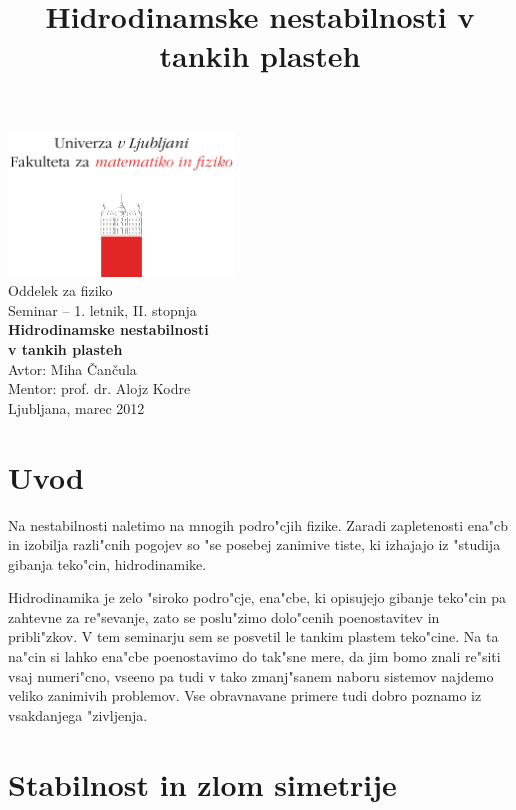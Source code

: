 \documentclass[a4paper,10pt]{article}
\title{Hidrodinamske nestabilnosti v tankih plasteh}
\begin{document}
\begin{center}
\includegraphics[width=6cm]{../logo_fmf_uni-lj_sl}\\[0.5cm]
Oddelek za fiziko \\[2cm]
{ \large Seminar -- 1. letnik, II. stopnja } \\[1cm]
{ \huge \bf Hidrodinamske nestabilnosti \\ v tankih plasteh}\\[2cm]
{\large Avtor: Miha \v Can\v cula}\\[0.6cm]
{\large Mentor: prof. dr. Alojz Kodre} \\[0.6cm]
{\large Ljubljana, marec 2012}
\end{center}
\vfill

\begin{abstract}

\end{abstract}

\newpage

\tableofcontents

\section{Uvod}

Na nestabilnosti naletimo na mnogih podro"cjih fizike. Zaradi zapletenosti ena"cb in izobilja razli"cnih pogojev so "se posebej zanimive tiste, ki izhajajo iz "studija gibanja teko"cin, hidrodinamike. 

Hidrodinamika je zelo "siroko podro"cje, ena"cbe, ki opisujejo gibanje teko"cin pa zahtevne za re"sevanje, zato se poslu"zimo dolo"cenih poenostavitev in pribli"zkov. V tem seminarju sem se posvetil le tankim plastem teko"cine. Na ta na"cin si lahko ena"cbe poenostavimo do tak"sne mere, da jim bomo znali re"siti vsaj numeri"cno, vseeno pa tudi v tako zmanj"sanem naboru sistemov najdemo veliko zanimivih problemov. Vse obravnavane primere tudi dobro poznamo iz vsakdanjega "zivljenja. 

\section{Stabilnost in zlom simetrije}
\end{document}
